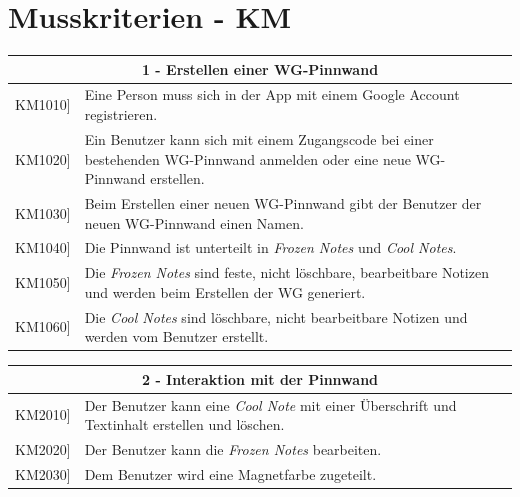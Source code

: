 \documentclass[a4paper]{scrreprt}
\begin{document}
    	\newpage
    
        \section{Musskriterien - KM}
        \begin{table}[h!]
        	\centering
        	\label{my-label}
        	\begin{tabular}{p{2cm}p{12cm}}
        		
        		\multicolumn{2}{c}{\textbf{1 - Erstellen einer WG-Pinnwand}} \\ \hline
        		\centering{[}KM1010{]} & Eine Person muss sich in der App mit einem Google Account registrieren.\\
        		\centering{[}KM1020{]}& Ein Benutzer kann sich mit einem Zugangscode bei einer bestehenden WG-Pinnwand anmelden oder eine neue WG-Pinnwand erstellen.                                 \\
        		\centering{[}KM1030{]}& Beim Erstellen einer neuen WG-Pinnwand gibt der Benutzer der neuen WG-Pinnwand einen Namen.\\ 
        		\centering{[}KM1040{]}& Die Pinnwand ist unterteilt in \textit{Frozen Notes} und \textit{Cool Notes}.\\ 
        		\centering{[}KM1050{]}& Die \textit{Frozen Notes} sind feste, nicht löschbare, bearbeitbare Notizen und werden beim Erstellen der WG generiert.\\ 
        		\centering{[}KM1060{]}& Die \textit{Cool Notes} sind löschbare, nicht bearbeitbare Notizen und werden vom Benutzer erstellt.\\ 
        		\hline
        	\end{tabular}
        \end{table}
    
    	\vspace{5mm}
    	
    	\begin{table}[h!]
    		\centering
    		\label{my-label}
    		\begin{tabular}{p{2cm}p{12cm}}
    			
    			\multicolumn{2}{c}{\textbf{2 - Interaktion mit der Pinnwand}} \\ \hline
    			\centering{[}KM2010{]} & Der Benutzer kann eine \textit{Cool Note} mit einer Überschrift und Textinhalt erstellen und löschen.\\
    			\centering{[}KM2020{]}& Der Benutzer kann die \textit{Frozen Notes} bearbeiten.                                 \\
    			\centering{[}KM2030{]}& Dem Benutzer wird eine Magnetfarbe zugeteilt.\\ 
    			
    			\hline
    		\end{tabular}
    	\end{table}
    
\end{document}

